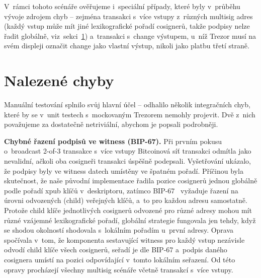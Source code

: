 V~rámci tohoto scénáře ověřujeme i~speciální případy, které byly v~průběhu
vývoje zdrojem chyb -- zejména transakci s~více vstupy z~různých multisig
adres (každý vstup může mít jiné lexikografické pořadí cosignerů, takže
podpisy nelze řadit globálně, viz~sekci~\ref{sec:test-chyby}) a~transakci
s~change výstupem, u~níž Trezor musí na svém displeji označit change jako
vlastní výstup, nikoli jako platbu třetí straně.

\section{Nalezené chyby}
\label{sec:test-chyby}

Manuální testování splnilo svůj hlavní účel -- odhalilo několik integračních
chyb, které by se v~unit testech s~mockovaným Trezorem nemohly projevit.
Dvě z~nich považujeme za dostatečně netriviální, abychom je popsali
podrobněji.

\textbf{Chybné řazení podpisů ve witness (BIP-67).}
Při prvním pokusu o~broadcast 2-of-3 transakce s~více vstupy Bitcoinová síť
transakci odmítla jako nevalidní, ačkoli oba cosigneři transakci úspěšně
podepsali. Vyšetřování ukázalo, že podpisy byly ve witness datech umístěny
ve špatném pořadí. Příčinou byla skutečnost, že naše původní implementace
řadila pozice cosignerů jednou globálně podle pořadí xpub klíčů v~deskriptoru,
zatímco BIP-67~\cite{BIP67} vyžaduje řazení na úrovni odvozených (child)
veřejných klíčů, a~to pro každou adresu samostatně. Protože child klíče
jednotlivých cosignerů odvozené pro různé adresy mohou mít různé vzájemné
lexikografické pořadí, globální strategie fungovala jen tehdy, když se
shodou okolností shodovala s~lokálním pořadím u~první adresy. Oprava
spočívala v~tom, že komponenta sestavující witness pro každý vstup nezávisle
odvodí child klíče všech cosignerů, seřadí je dle BIP-67 a~podpis daného
cosignera umístí na pozici odpovídající v~tomto lokálním seřazení. Od této
opravy procházejí všechny multisig scénáře včetně transakcí s~více vstupy.

